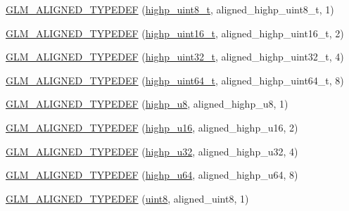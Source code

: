 \begin{DoxyCompactItemize}
\item 
\hyperlink{group__gtx__type__aligned_gaff50b10dd1c48be324fdaffd18e2c7ea}{G\+L\+M\+\_\+\+A\+L\+I\+G\+N\+E\+D\+\_\+\+T\+Y\+P\+E\+D\+E\+F} (\hyperlink{group__gtc__type__precision_ga9ba529fcc75b82d23da979f0ce6e4518}{highp\+\_\+uint8\+\_\+t}, aligned\+\_\+highp\+\_\+uint8\+\_\+t, 1)
\item 
\hyperlink{group__gtx__type__aligned_ga9fc4421dbb833d5461e6d4e59dcfde55}{G\+L\+M\+\_\+\+A\+L\+I\+G\+N\+E\+D\+\_\+\+T\+Y\+P\+E\+D\+E\+F} (\hyperlink{group__gtc__type__precision_ga3145bc0ee80432c165e985a188a722b3}{highp\+\_\+uint16\+\_\+t}, aligned\+\_\+highp\+\_\+uint16\+\_\+t, 2)
\item 
\hyperlink{group__gtx__type__aligned_ga329f1e2b94b33ba5e3918197030bcf03}{G\+L\+M\+\_\+\+A\+L\+I\+G\+N\+E\+D\+\_\+\+T\+Y\+P\+E\+D\+E\+F} (\hyperlink{group__gtc__type__precision_ga8eb85ad460079c63b68866ae34637bda}{highp\+\_\+uint32\+\_\+t}, aligned\+\_\+highp\+\_\+uint32\+\_\+t, 4)
\item 
\hyperlink{group__gtx__type__aligned_ga71e646f7e301aa422328194162c9c998}{G\+L\+M\+\_\+\+A\+L\+I\+G\+N\+E\+D\+\_\+\+T\+Y\+P\+E\+D\+E\+F} (\hyperlink{group__gtc__type__precision_ga6e66f40c5909bfc872b068187fa6029e}{highp\+\_\+uint64\+\_\+t}, aligned\+\_\+highp\+\_\+uint64\+\_\+t, 8)
\item 
\hyperlink{group__gtx__type__aligned_ga8942e09f479489441a7a5004c6d8cb66}{G\+L\+M\+\_\+\+A\+L\+I\+G\+N\+E\+D\+\_\+\+T\+Y\+P\+E\+D\+E\+F} (\hyperlink{group__gtc__type__precision_ga8a60abe782749c504fb5ae51eb8b49cc}{highp\+\_\+u8}, aligned\+\_\+highp\+\_\+u8, 1)
\item 
\hyperlink{group__gtx__type__aligned_gaab32497d6e4db16ee439dbedd64c5865}{G\+L\+M\+\_\+\+A\+L\+I\+G\+N\+E\+D\+\_\+\+T\+Y\+P\+E\+D\+E\+F} (\hyperlink{group__gtc__type__precision_ga9da2178d7501d9c0f225fa1a7b70cb45}{highp\+\_\+u16}, aligned\+\_\+highp\+\_\+u16, 2)
\item 
\hyperlink{group__gtx__type__aligned_gaaadbb34952eca8e3d7fe122c3e167742}{G\+L\+M\+\_\+\+A\+L\+I\+G\+N\+E\+D\+\_\+\+T\+Y\+P\+E\+D\+E\+F} (\hyperlink{group__gtc__type__precision_gae8e8a2c712653891a03c171795286ac5}{highp\+\_\+u32}, aligned\+\_\+highp\+\_\+u32, 4)
\item 
\hyperlink{group__gtx__type__aligned_ga92024d27c74a3650afb55ec8e024ed25}{G\+L\+M\+\_\+\+A\+L\+I\+G\+N\+E\+D\+\_\+\+T\+Y\+P\+E\+D\+E\+F} (\hyperlink{group__gtc__type__precision_ga6006ea883d3c0491791650b2fb84de39}{highp\+\_\+u64}, aligned\+\_\+highp\+\_\+u64, 8)
\item 
\hyperlink{group__gtx__type__aligned_gabde1d0b4072df35453db76075ab896a6}{G\+L\+M\+\_\+\+A\+L\+I\+G\+N\+E\+D\+\_\+\+T\+Y\+P\+E\+D\+E\+F} (\hyperlink{group__gtc__type__precision_ga1a7dcd8aac97cc8020817c94049deff2}{uint8}, aligned\+\_\+uint8, 1)

\end{DoxyCompactItemize}

